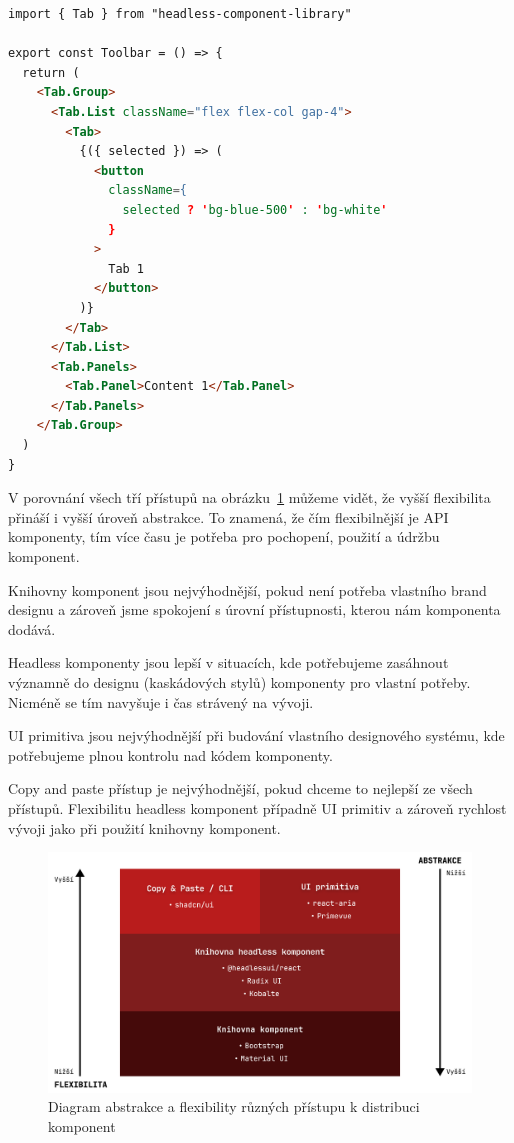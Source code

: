 \begin{lstlisting}[caption={Ukázka použití headless knihovny}, label={component-distribution-2}, language=html]
import { Tab } from "headless-component-library"

export const Toolbar = () => {
  return (
    <Tab.Group>
      <Tab.List className="flex flex-col gap-4">
        <Tab>
          {({ selected }) => (
            <button
              className={
                selected ? 'bg-blue-500' : 'bg-white'
              }
            >
              Tab 1
            </button>
          )}
        </Tab>
      </Tab.List>
      <Tab.Panels>
        <Tab.Panel>Content 1</Tab.Panel>
      </Tab.Panels>
    </Tab.Group>
  )
}
\end{lstlisting}

\clearpage

V porovnání všech tří přístupů na obrázku~\ref{component-lib-distribution-comparison} můžeme vidět, že vyšší flexibilita přináší i vyšší úroveň abstrakce.
To znamená, že čím flexibilnější je API komponenty, tím více času je potřeba pro pochopení, použití a údržbu komponent.

Knihovny komponent jsou nejvýhodnější, pokud není potřeba vlastního brand designu a zároveň jsme spokojení s úrovní přístupnosti, kterou nám komponenta dodává.

Headless komponenty jsou lepší v situacích, kde potřebujeme zasáhnout významně do designu (kaskádových stylů) komponenty pro vlastní potřeby.
Nicméně se tím navyšuje i čas strávený na vývoji.

UI primitiva jsou nejvýhodnější při budování vlastního designového systému, kde potřebujeme plnou kontrolu nad kódem komponenty.

Copy and paste přístup je nejvýhodnější, pokud chceme to nejlepší ze všech přístupů.
Flexibilitu headless komponent případně UI primitiv a zároveň rychlost vývoji jako při použití knihovny komponent.

\begin{figure}[h]
      \centering
      \includegraphics[width=\textwidth]{./assets/figures/component-lib-distribution-comparison.png}
      \captionsetup{justification=centering}
      \caption{Diagram abstrakce a flexibility různých přístupu k distribuci komponent}
      \label{component-lib-distribution-comparison}
\end{figure}

